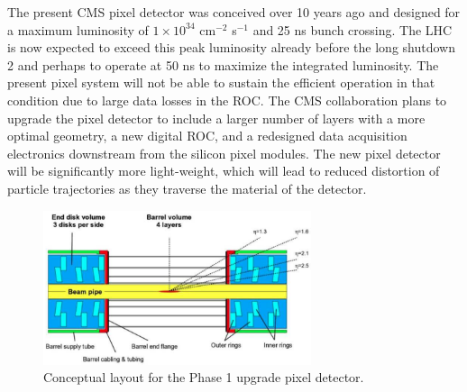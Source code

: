 


The present CMS pixel detector was conceived over 10 years ago and
designed for a maximum luminosity of $1 \times 10^{34}$ cm$^{-2}$
s$^{-1}$ and 25 ns bunch crossing. The LHC is now expected to exceed
this peak luminosity already before the long shutdown 2 and perhaps to
operate at 50 ns to maximize the integrated luminosity. The present
pixel system will not be able to sustain the efficient operation in
that condition due to large data losses in the ROC.
The CMS collaboration plans to upgrade the pixel detector to include a
larger number of layers with a more optimal geometry, a new digital
ROC, and a redesigned data acquisition electronics downstream from the
silicon pixel modules. The new pixel detector will be significantly
more light-weight, which will lead to reduced distortion of particle
trajectories as they traverse the material of the detector. 

\begin{figure}[htb]
  \centering
  \includegraphics[width=0.7\textwidth]{Phase_1_pixel_detector.png}
  \caption{\label{fig:phase1pixels}
    Conceptual layout for the Phase 1 upgrade pixel detector.
  }
\end{figure}

